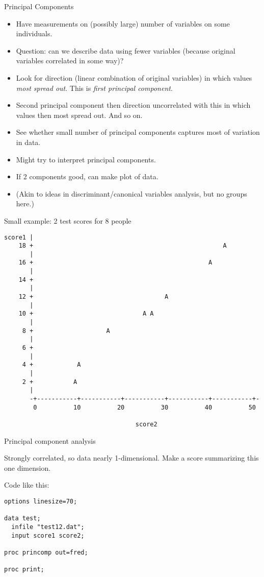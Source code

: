 \documentclass[pdf]{prosper}
\begin{document}
\begin{slide}{Principal Components}
  \begin{itemize}
  \item Have measurements on (possibly large) number of variables on some individuals.
  \item Question: can we describe data using fewer variables (because original variables correlated in some way)?
  \item Look for direction (linear combination of original variables) in which values {\em most spread out}. This is {\em first principal component}.
  \item Second principal component then direction uncorrelated with this in which values then most spread out. And so on.
  \item See whether small number of principal components captures most of variation in data.
  \item Might try to interpret principal components.
  \item If 2 components good, can make plot of data.
  \item (Akin to ideas in discriminant/canonical variables analysis, but no groups here.)
\end{itemize}

\end{slide}

\begin{slide}{Small example: 2 test scores for 8 people}

{\scriptsize
\begin{verbatim}
score1 |
    18 +                                                    A
       |
    16 +                                                A
       |
    14 +
       |
    12 +                                    A
       |
    10 +                              A A
       |
     8 +                    A
       |
     6 +
       |
     4 +            A
       |
     2 +           A
       |
       -+-----------+-----------+-----------+-----------+-----------+-
        0          10          20          30          40          50

                                    score2

\end{verbatim}
}

  
\end{slide}

\begin{slide}{Principal component analysis}

Strongly correlated, so data nearly 1-dimensional. Make a score summarizing this one dimension.


Code like this:

\begin{verbatim}
options linesize=70;

data test;
  infile "test12.dat";
  input score1 score2;

proc princomp out=fred;

proc print;

\end{verbatim}
  
\end{slide}
\end{document}
